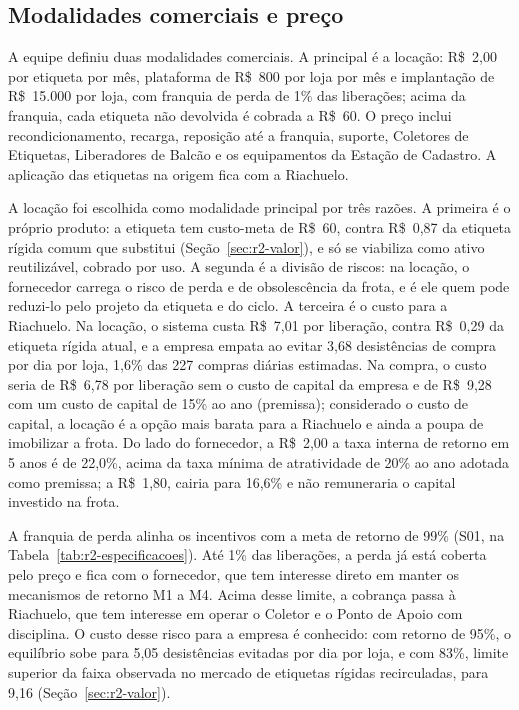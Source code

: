 \subsection{Modalidades comerciais e preço}
\label{sub:r2-modalidades}

A equipe definiu duas modalidades comerciais. A principal é a locação: R\$~2,00 por etiqueta por mês, plataforma de R\$~800 por loja por mês e implantação de R\$~15.000 por loja, com franquia de perda de 1\% das liberações; acima da franquia, cada etiqueta não devolvida é cobrada a R\$~60. O preço inclui recondicionamento, recarga, reposição até a franquia, suporte, Coletores de Etiquetas, Liberadores de Balcão e os equipamentos da Estação de Cadastro. A aplicação das etiquetas na origem fica com a Riachuelo.

A locação foi escolhida como modalidade principal por três razões. A primeira é o próprio produto: a etiqueta tem custo-meta de R\$~60, contra R\$~0,87 da etiqueta rígida comum que substitui (Seção~\ref{sec:r2-valor}), e só se viabiliza como ativo reutilizável, cobrado por uso. A segunda é a divisão de riscos: na locação, o fornecedor carrega o risco de perda e de obsolescência da frota, e é ele quem pode reduzi-lo pelo projeto da etiqueta e do ciclo. A terceira é o custo para a Riachuelo. Na locação, o sistema custa R\$~7,01 por liberação, contra R\$~0,29 da etiqueta rígida atual, e a empresa empata ao evitar 3,68 desistências de compra por dia por loja, 1,6\% das 227 compras diárias estimadas. Na compra, o custo seria de R\$~6,78 por liberação sem o custo de capital da empresa e de R\$~9,28 com um custo de capital de 15\% ao ano (premissa); considerado o custo de capital, a locação é a opção mais barata para a Riachuelo e ainda a poupa de imobilizar a frota. Do lado do fornecedor, a R\$~2,00 a taxa interna de retorno em 5 anos é de 22,0\%, acima da taxa mínima de atratividade de 20\% ao ano adotada como premissa; a R\$~1,80, cairia para 16,6\% e não remuneraria o capital investido na frota.

A franquia de perda alinha os incentivos com a meta de retorno de 99\% (S01, na Tabela~\ref{tab:r2-especificacoes}). Até 1\% das liberações, a perda já está coberta pelo preço e fica com o fornecedor, que tem interesse direto em manter os mecanismos de retorno M1 a M4. Acima desse limite, a cobrança passa à Riachuelo, que tem interesse em operar o Coletor e o Ponto de Apoio com disciplina. O custo desse risco para a empresa é conhecido: com retorno de 95\%, o equilíbrio sobe para 5,05 desistências evitadas por dia por loja, e com 83\%, limite superior da faixa observada no mercado de etiquetas rígidas recirculadas, para 9,16 (Seção~\ref{sec:r2-valor}).

